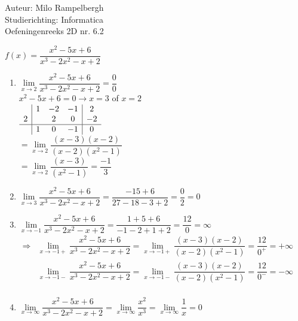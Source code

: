 \documentclass[a4paper]{article}
\newcommand{\fx}{\dfrac{x^2-5x+6}{x^3-2x^2-x+2}}
\newcommand{\llim}[1]{ \lim\limits_{x \rightarrow #1} }
\newcommand{\fxf}{\dfrac{(x-3)(x-2)}{(x-2)(x^2-1)}}
\begin{document}
\noindent \large Auteur: Milo Rampelbergh \\
\noindent \large Studierichting: Informatica\\
\noindent \large Oefeningenreeks 2D nr. 6.2\\

\medskip

\normalsize


$ f(x) = \fx $\\

\begin{enumerate}
\item $ \llim{2} \fx = \dfrac{0}{0} $\\

\hspace{1.5cm} $ x^2-5x+6 = 0 \rightarrow x = 3 $ of $ x = 2 $ \\

\hspace{1.5cm} $ \begin{array}{c|ccc|c}
& 1 & -2 & -1 & 2 \\
2 & & 2 & 0 & -2 \\
\hline
& 1 & 0 & -1 & 0 \\
\end{array} $ \\

$ = \llim{2} \dfrac{(x-3)(x-2)}{(x-2)(x^2-1)} $ \\

$ = \llim{2} \dfrac{(x-3)}{(x^2-1)} = \dfrac{-1}{3} $ \\

\item $ \llim{3} \fx = \dfrac{-15+6}{27-18-3+2} = \dfrac{0}{2} = 0 $ \\

\item $ \llim{-1} \fx = \dfrac{1+5+6}{-1-2+1+2} = \dfrac{12}{0} = \infty $ \\

$ \begin{array}{ll}
\Rightarrow & \llim{-1+} \fx = \llim{-1+} \fxf = \dfrac{12}{0^+} = +\infty \\
& \llim{-1-} \fx = \llim{-1-} \fxf = \dfrac{12}{0^-} = -\infty \\
\end{array} $  \\

\item $ \llim{\infty} \fx = \llim{\infty} \dfrac{x^2}{x^3} = \llim{\infty} \dfrac{1}{x} = 0 $ \\


\end{enumerate}
\end{document}
